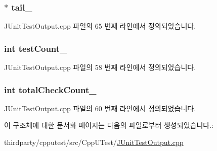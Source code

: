 \subsubsection[{\texorpdfstring{tail\+\_\+}{tail_}}]{$\ast$ tail\+\_\+}\hypertarget{struct_j_unit_test_group_result_a4d358acecdc5260d58b9d2fc96fe107a}{}\label{struct_j_unit_test_group_result_a4d358acecdc5260d58b9d2fc96fe107a}


J\+Unit\+Test\+Output.\+cpp 파일의 65 번째 라인에서 정의되었습니다.

\subsubsection[{\texorpdfstring{test\+Count\+\_\+}{testCount_}}]{\setlength{\rightskip}{0pt plus 5cm}int test\+Count\+\_\+}\hypertarget{struct_j_unit_test_group_result_ace881ee661bae3d8b8d63b6888f80a36}{}\label{struct_j_unit_test_group_result_ace881ee661bae3d8b8d63b6888f80a36}


J\+Unit\+Test\+Output.\+cpp 파일의 58 번째 라인에서 정의되었습니다.

\subsubsection[{\texorpdfstring{total\+Check\+Count\+\_\+}{totalCheckCount_}}]{\setlength{\rightskip}{0pt plus 5cm}int total\+Check\+Count\+\_\+}\hypertarget{struct_j_unit_test_group_result_ad899c291f0b26f32a1ea9b2e0768b53f}{}\label{struct_j_unit_test_group_result_ad899c291f0b26f32a1ea9b2e0768b53f}


J\+Unit\+Test\+Output.\+cpp 파일의 60 번째 라인에서 정의되었습니다.



이 구조체에 대한 문서화 페이지는 다음의 파일로부터 생성되었습니다.\+:\begin{DoxyCompactItemize}
\item 
thirdparty/cpputest/src/\+Cpp\+U\+Test/\hyperlink{_j_unit_test_output_8cpp}{J\+Unit\+Test\+Output.\+cpp}\end{DoxyCompactItemize}
